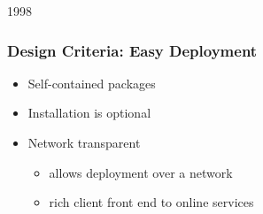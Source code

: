 \begin{slide}{1998}\frametitle{Design Criteria: Easy Deployment}

\begin{itemize}
\item Self-contained packages
\item Installation is optional
\item Network transparent
  \begin{itemize}
  \item allows deployment over a network
  \item rich client front end to online services
  \end{itemize}
\end{itemize}

\end{slide}

